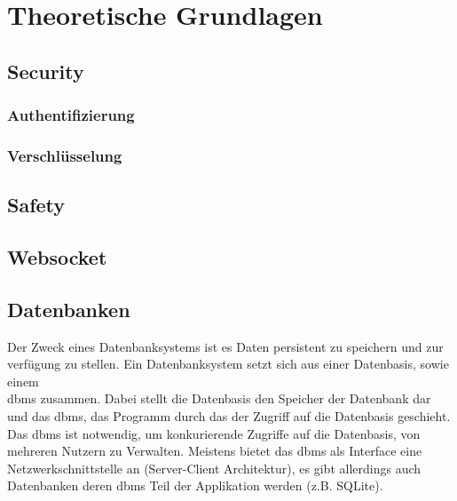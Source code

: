 \chapter{Theoretische Grundlagen}
\section{Security}
\subsection{Authentifizierung}
\subsection{Verschlüsselung}
\section{Safety}
\section{Websocket}
\section{Datenbanken}
Der Zweck eines Datenbanksystems ist es Daten persistent zu speichern und zur verfügung zu stellen.
Ein Datenbanksystem setzt sich aus einer Datenbasis, sowie einem\\ \ac{dbms} zusammen.
Dabei stellt die Datenbasis den Speicher der Datenbank dar und das \ac{dbms}, 
das Programm durch das der Zugriff auf die Datenbasis geschieht.
Das \ac{dbms} ist notwendig, um konkurierende Zugriffe auf die Datenbasis, von mehreren Nutzern zu Verwalten. \citep{Schubert:2007:3}
Meistens bietet das \ac{dbms} als Interface eine Netzwerkschnittstelle an (Server-Client Architektur), es gibt allerdings auch Datenbanken deren \ac{dbms} Teil der Applikation werden (z.B. SQLite).
